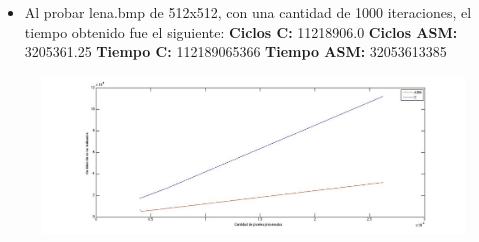 \documentclass[10pt, a4paper]{article}
\begin{document}
\begin{itemize}
\begin{itemize}
\item{Al probar lena.bmp de 512x512, con una cantidad de 1000 iteraciones, el tiempo obtenido fue el siguiente:\newline
\newline
\textbf{Ciclos C:}                 11218906.0\newline
\vspace{0.15cm}
\textbf{Ciclos ASM:}               3205361.25\newline
\textbf{Tiempo C:}                 112189065366\newline
\textbf{Tiempo ASM:}               32053613385\newline}
\end{itemize}
\end{itemize}

\begin{figure}[H] %
\begin{center}
\includegraphics[width=560pt]{./ciclosRotar.jpg}
\end{center}
\end{figure}
\end{document}
